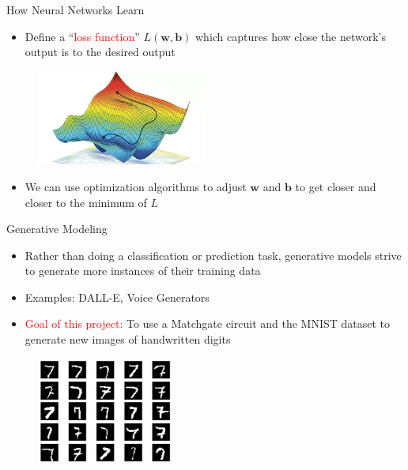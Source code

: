 \documentclass[xcolor=dvipsnames]{beamer}
\begin{document}
\begin{frame}{How Neural Networks Learn}
  
  \begin{itemize}
    \item Define a ``\textcolor{red}{loss function}'' $L(\bm{w},\bm{b})$ which captures how close the network's output is to the desired output
  \end{itemize}

  \begin{figure}
    \centering
    \includegraphics[width=0.5\textwidth]{gd.png}
  \end{figure}

  \begin{itemize}
    \item We can use optimization algorithms to adjust $\bm{w}$ and $\bm{b}$ to get closer and closer to the minimum of $L$ 
  \end{itemize}

\end{frame}

\begin{frame}{Generative Modeling}

    \begin{itemize}
      \item Rather than doing a classification or prediction task, generative models strive to generate more instances of their training data
      \item Examples: DALL-E, Voice Generators
      \item \textcolor{red}{Goal of this project:} To use a Matchgate circuit and the MNIST dataset to generate new images of handwritten digits
    \end{itemize}

    \begin{figure}
      \centering
          \includegraphics[width=0.4\textwidth]{MNIST.png}
      \end{figure}

\end{frame}
\end{document}
